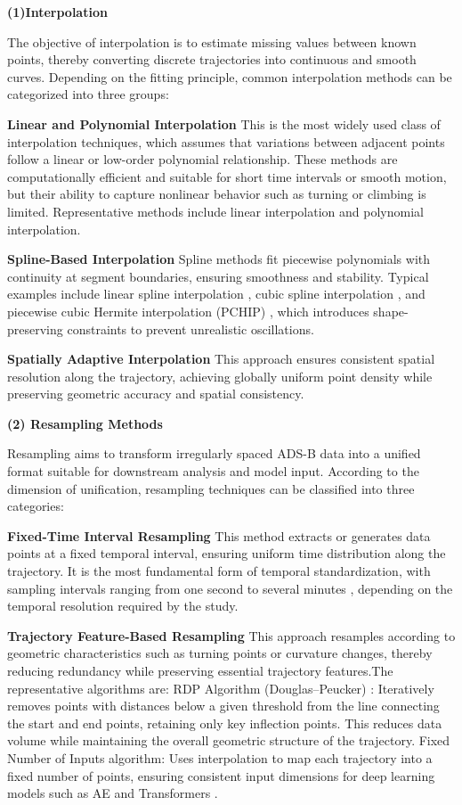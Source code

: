 \textbf{(1)Interpolation}

The objective of interpolation is to estimate missing values between known points, thereby converting discrete trajectories into continuous and smooth curves.
Depending on the fitting principle, common interpolation methods can be categorized into three groups:

\textbf{Linear and Polynomial Interpolation}
This is the most widely used class of interpolation techniques, which assumes that variations between adjacent points follow a linear or low-order polynomial relationship.
These methods are computationally efficient and suitable for short time intervals or smooth motion, but their ability to capture nonlinear behavior such as turning or climbing is limited.
Representative methods include linear interpolation \cite{lindner2021aircraft} and polynomial interpolation.

\textbf{Spline-Based Interpolation}
Spline methods fit piecewise polynomials with continuity at segment boundaries, ensuring smoothness and stability.
Typical examples include linear spline interpolation \cite{sun2019wrap}, cubic spline interpolation \cite{shafienya20224d}, and piecewise cubic Hermite interpolation (PCHIP) \cite{10311324}, which introduces shape-preserving constraints to prevent unrealistic oscillations.

\textbf{Spatially Adaptive Interpolation}
This approach ensures consistent spatial resolution along the trajectory, achieving globally uniform point density while preserving geometric accuracy and spatial consistency.

\textbf{(2) Resampling Methods}

Resampling aims to transform irregularly spaced ADS-B data into a unified format suitable for downstream analysis and model input.
According to the dimension of unification, resampling techniques can be classified into three categories:

\textbf{Fixed-Time Interval Resampling}
This method extracts or generates data points at a fixed temporal interval, ensuring uniform time distribution along the trajectory.
It is the most fundamental form of temporal standardization, with sampling intervals ranging from one second \cite{WANG2020101840} to several minutes \cite{vos2024transformer}, depending on the temporal resolution required by the study.

\textbf{Trajectory Feature-Based Resampling}
This approach resamples according to geometric characteristics such as turning points or curvature changes, thereby reducing redundancy while preserving essential trajectory features.The representative algorithms are: RDP Algorithm (Douglas–Peucker) \cite{SCHULTZ2022102164}: Iteratively removes points with distances below a given threshold from the line connecting the start and end points, retaining only key inflection points. This reduces data volume while maintaining the overall geometric structure of the trajectory. 
Fixed Number of Inputs algorithm: Uses interpolation to map each trajectory into a fixed number of points, ensuring consistent input dimensions for deep learning models such as AE \cite{olive2018detecting} and Transformers \cite{BAO2024102667}.

